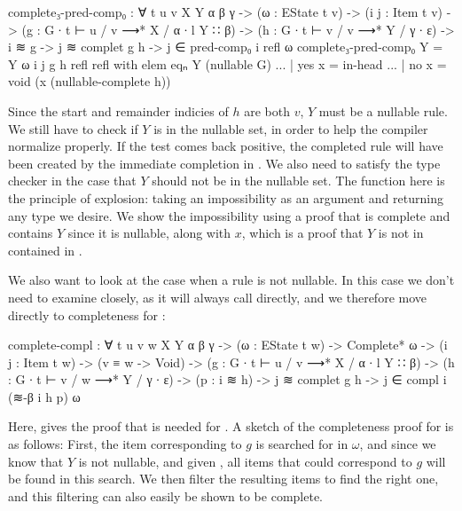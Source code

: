 		\begin{code}
			  complete₃-pred-comp₀ : ∀ {t u v X Y α β γ} ->
			    (ω : EState t v) ->
			    (i j : Item t v) ->
			    (g : G ∙ t ⊢ u / v ⟶* X / α ∙ l Y ∷ β) ->
			    (h : G ∙ t ⊢ v / v ⟶* Y / γ ∙ ε) ->
			    i ≋ g ->
			    j ≋ complet g h ->
			      j ∈ pred-comp₀ i refl ω
			  complete₃-pred-comp₀ {Y = Y} ω i j g h refl refl
			      with elem eqₙ Y (nullable G)
			  ... | yes x = in-head
			  ... | no x = void (x (nullable-complete h))
		\end{code}

		Since the start and remainder indicies of $h$ are both $v$, $Y$ must be
		a nullable rule. We still have to check if $Y$ is in the nullable set,
		in order to help the compiler normalize  properly.
		If the test comes back positive, the completed rule will have been
		created by the immediate completion in . We also
		need to satisfy the type checker in the case that $Y$ should not be in
		the nullable set. The  function here is the principle of
		explosion: taking an impossibility as an argument and returning any
		type we desire. We show the impossibility using a proof that
		 is complete and contains $Y$ since it is nullable,
		along with $x$, which is a proof that $Y$ is not in contained in
		.

		We also want to look at the case when a rule is not nullable. In this
		case we don't need to examine  closely, as it will
		always call  directly, and we therefore move directly to
		completeness for :

		\begin{code}
			  complete-compl : ∀ {t u v w X Y α β γ} ->
			    (ω : EState t w) ->
			    Complete* ω ->
			    (i j : Item t w) ->
			    (v ≡ w -> Void) ->
			    (g : G ∙ t ⊢ u / v ⟶* X / α ∙ l Y ∷ β) ->
			    (h : G ∙ t ⊢ v / w ⟶* Y / γ ∙ ε) ->
			    (p : i ≋ h) ->
			    j ≋ complet g h ->
			      j ∈ compl i (≋-β i h p) ω
		\end{code}

		Here,  gives the proof  that is
		needed for . A sketch of the completeness proof for
		 is as follows: First, the item corresponding to $g$ is
		searched for in $\omega$, and since we know that $Y$ is not nullable,
		and given , all items that could correspond to $g$
		will be found in this search. We then filter the resulting items to 
		find the right one, and this filtering can also easily be shown to be 
		complete.

